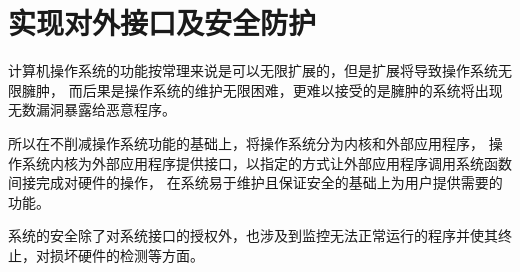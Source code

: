 \section{实现对外接口及安全防护}

计算机操作系统的功能按常理来说是可以无限扩展的，但是扩展将导致操作系统无限臃肿，
而后果是操作系统的维护无限困难，更难以接受的是臃肿的系统将出现无数漏洞暴露给恶意程序。

所以在不削减操作系统功能的基础上，将操作系统分为内核和外部应用程序，
操作系统内核为外部应用程序提供接口，以指定的方式让外部应用程序调用系统函数间接完成对硬件的操作，
在系统易于维护且保证安全的基础上为用户提供需要的功能。

系统的安全除了对系统接口的授权外，也涉及到监控无法正常运行的程序并使其终止，对损坏硬件的检测等方面。
